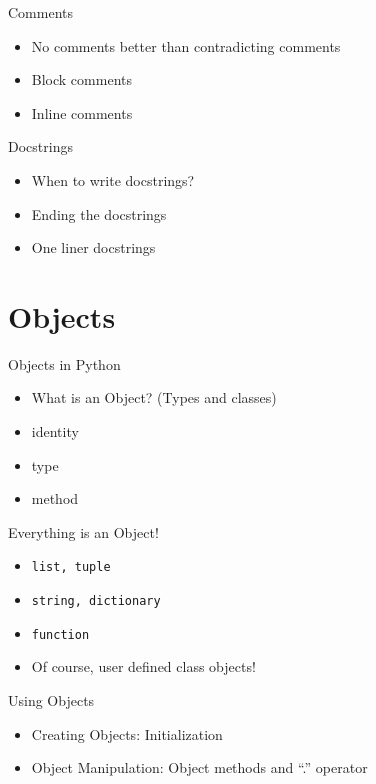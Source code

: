 \documentclass[14pt,compress]{beamer}
\newcounter{time}
\newcommand{\inctime}[1]{\addtocounter{time}{#1}{\tiny \thetime\ m}}
\newcommand{\typ}[1]{\texttt{#1}}
\begin{document}
\begin{frame}{Comments}
  \begin{itemize}
        \item No comments better than contradicting comments
        \item Block comments
        \item Inline comments
   \end{itemize}
\end{frame}

\begin{frame}{Docstrings}
  \begin{itemize}
        \item When to write docstrings?
        \item Ending the docstrings
        \item One liner docstrings
   \end{itemize}
\inctime{10}
\end{frame}


\section{Objects}
\begin{frame}{Objects in Python}
    \begin{itemize}
        \item What is an Object? (Types and classes)
        \item identity
        \item type
        \item method
      \end{itemize}
\end{frame}

\begin{frame}{Everything is an Object!}
  \begin{itemize}
    \item \typ{list, tuple}
    \item \typ{string, dictionary}
    \item \typ{function}
    \item Of course, user defined class objects!
  \end{itemize}
\end {frame}

\begin{frame}{Using Objects}
  \begin{itemize}
    \item Creating Objects: Initialization
    \item Object Manipulation: Object methods and ``.'' operator
  \end{itemize}
\end{frame}
\end{document}
